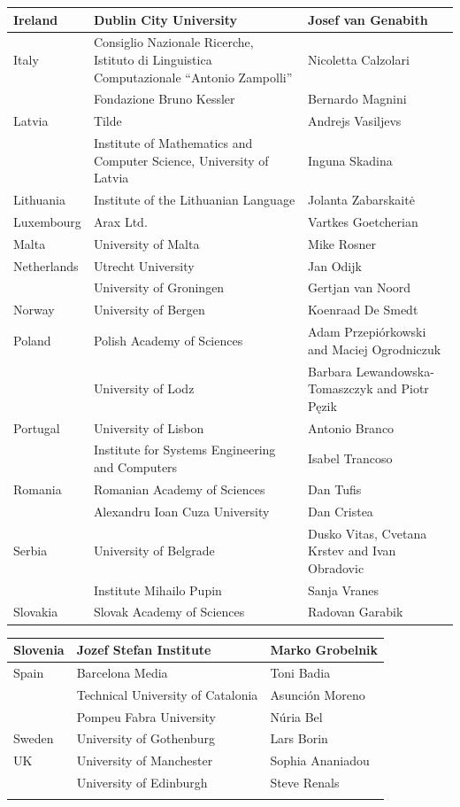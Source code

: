 \documentclass[]{../metanetpaper}
\begin{document}
\begin{tabular}{|p{1.5cm}|p{3cm}|p{5cm}|}	
\hline Ireland & Dublin City University & Josef van Genabith\\
\hline Italy & Consiglio Nazionale Ricerche,  Istituto di Linguistica Computazionale “Antonio Zampolli” & Nicoletta Calzolari\\
\hline & Fondazione Bruno Kessler & Bernardo Magnini\\
\hline Latvia & Tilde & Andrejs Vasiljevs\\
\hline & Institute of Mathematics and Computer Science, University of Latvia & Inguna Skadina\\
\hline Lithuania & Institute of the Lithuanian Language & Jolanta Zabarskaitė\\
\hline Luxembourg & Arax Ltd. & Vartkes Goetcherian\\
\hline Malta & University of Malta & Mike Rosner\\
\hline Netherlands & Utrecht University & Jan Odijk\\
\hline & University of Groningen & Gertjan van Noord\\
\hline Norway & University of Bergen & Koenraad De Smedt\\
\hline Poland & Polish Academy of Sciences & Adam Przepiórkowski and
Maciej Ogrodniczuk \\
\hline & University of Lodz & Barbara Lewandowska-Tomaszczyk and Piotr Pęzik\\
\hline Portugal & University of Lisbon & Antonio Branco\\
\hline & Institute for Systems Engineering and Computers & Isabel Trancoso\\
\hline Romania & Romanian Academy of Sciences & Dan Tufis\\
\hline & Alexandru Ioan Cuza University & Dan Cristea\\
\hline Serbia & University of Belgrade & Dusko Vitas, Cvetana Krstev and
Ivan Obradovic\\
\hline & Institute Mihailo Pupin & Sanja Vranes\\
\hline Slovakia & Slovak Academy of Sciences & Radovan Garabik\\
\end{tabular}

\begin{tabular}{|p{1.5cm}|p{3cm}|p{5cm}|}
\hline Slovenia & Jozef Stefan Institute & Marko Grobelnik\\
\hline Spain & Barcelona Media & Toni Badia\\
\hline & Technical University of Catalonia & Asunción Moreno\\
\hline  & Pompeu Fabra University & Núria Bel\\
\hline Sweden & University of Gothenburg & Lars Borin\\
\hline UK & University of Manchester & Sophia Ananiadou\\
\hline & University of Edinburgh & Steve Renals\\
\hline  & & \\
\end{tabular}  
	
\end{document}
